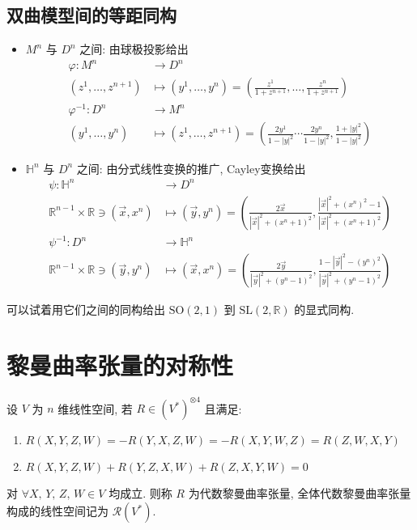 \documentclass{book}
\begin{document}
    \subsection{双曲模型间的等距同构}
        \begin{itemize}
            \item $M^n$ 与 $D^n$ 之间: 由球极投影给出
            \begin{align*}
                \varphi:M^n&\rightarrow D^n \\
                \left(z^1,\dots,z^{n+1}\right)&\mapsto\left(y^1,\dots,y^n\right)=\left(\frac{z^1}{1+z^{n+1}},\dots,\frac{z^n}{1+z^{n+1}}\right) \\
                \varphi^{-1}:D^n&\rightarrow M^n \\
                \left(y^1,\dots,y^n\right)&\mapsto\left(z^1,\dots,z^{n+1}\right)=\left(\frac{2y^1}{1-|y|^2}\cdots\frac{2y^n}{1-|y|^2},\frac{1+|y|^2}{1-|y|^2}\right)
            \end{align*}
            \item $\mathbb{H}^n$ 与 $D^n$ 之间: 由分式线性变换的推广, Cayley变换给出
            \begin{align*}
                \psi:\mathbb{H}^n&\rightarrow D^n \\
                \mathbb{R}^{n-1}\times\mathbb{R}\ni\left(\vec{x},x^n\right)&\mapsto\left(\vec{y},y^n\right)=\left(\frac{2\vec{x}}{|\vec{x}|^2+(x^n+1)^2},\frac{|\vec{x}|^2+(x^n)^2-1}{|\vec{x}|^2+(x^n+1)^2}\right) \\
                \psi^{-1}:D^n&\rightarrow\mathbb{H}^n \\
                \mathbb{R}^{n-1}\times\mathbb{R}\ni\left(\vec{y},y^n\right)&\mapsto\left(\vec{x},x^n\right)=\left(\frac{2\vec{y}}{|\vec{y}|^2+(y^n-1)^2},\frac{1-|\vec{y}|^2-(y^n)^2}{|\vec{y}|^2+(y^n-1)^2}\right)
            \end{align*}
        \end{itemize}
        可以试着用它们之间的同构给出 $\mathrm{SO}(2,1)$ 到 $\mathrm{SL}(2,\mathbb{R})$ 的显式同构.
    
    \section{黎曼曲率张量的对称性}
        设 $V$ 为 $n$ 维线性空间, 若 $R\in(V^*)^{\otimes4}$ 且满足:
        \begin{enumerate}
            \item $R(X,Y,Z,W) = -R(Y,X,Z,W) = -R(X,Y,W,Z) = R(Z,W,X,Y)$
            \item $R(X,Y,Z,W) + R(Y,Z,X,W) + R(Z,X,Y,W) = 0$
        \end{enumerate} 对 $\forall X,\,Y,\,Z,\,W\in V$ 均成立.
        则称 $R$ 为代数黎曼曲率张量, 全体代数黎曼曲率张量构成的线性空间记为 $\mathcal{R}(V^*)$.
\end{document}
